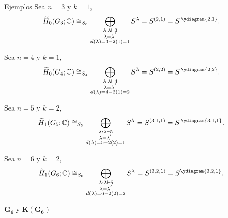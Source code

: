 \documentclass[final,xcolor=svgnames]{beamer}
\begin{document}
\begin{frame}{}
\begin{columns}
\begin{column}{0.5\textwidth}
        \begin{block}{Ejemplos} 
          Sea $n=3$ y $k=1$,
          \begin{equation*}
            \widetilde H_{0}(G_{3};\mathbb{C})\cong_{S_{3}}\bigoplus_{\substack{\lambda:\lambda\vdash 3\\
                \lambda=\lambda^{'}\\d(\lambda)=3-2(1)=1}} S^{\lambda}=S^{(2,1)}=S^{\,\ydiagram{2,1}}.
          \end{equation*}
          
          Sea $n=4$ y $k=1$,
          \begin{equation*}
            \widetilde H_{0}(G_{4};\mathbb{C})\cong_{S_{4}}\bigoplus_{\substack{\lambda:\lambda\vdash 4\\
                \lambda=\lambda^{'}\\d(\lambda)=4-2(1)=2}} S^{\lambda}=S^{(2,2)}=S^{\,\ydiagram{2,2}}.
          \end{equation*}

          Sea $n=5$ y $k=2$,
          \begin{equation*}
            \widetilde H_{1}(G_{5};\mathbb{C})\cong_{S_{5}}\bigoplus_{\substack{\lambda:\lambda\vdash 5\\
                \lambda=\lambda^{'}\\d(\lambda)=5-2(2)=1}} S^{\lambda}=S^{(3,1,1)}=S^{\,\ydiagram{3,1,1}}.
          \end{equation*}
        
        Sea $n=6$ y $k=2$,
      \begin{equation*}
        \widetilde H_{1}(G_{6};\mathbb{C})\cong_{S_{6}}\bigoplus_{\substack{\lambda:\lambda\vdash 6\\
            \lambda=\lambda^{'}\\d(\lambda)=6-2(2)=2}} S^{\lambda}=S^{(3,2,1)}=S^{\ydiagram{3,2,1}}.
      \end{equation*}
    \end{block}
      
\begin{block}{$\boldsymbol{G_6}$ y $\boldsymbol{K(G_6)}$}
   \begin{minipage}{0.53\linewidth}    
    \centering


\end{minipage}
\end{block}
\end{column}
\end{columns}
\end{frame}
\end{document}
